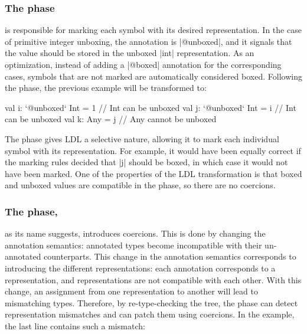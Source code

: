 \vspace{-0.2em}
\subsubsection{The \inject{} phase} is responsible for marking each symbol with its desired representation. In the case of primitive integer unboxing, the annotation is |@unboxed|, and it signals that the value should be stored in the unboxed |int| representation. As an optimization, instead of adding a |@boxed| annotation for the corresponding cases, symbols that are not marked are automatically considered boxed. Following the \inject{} phase, the previous example will be transformed to:

\vspace{-0.1em}
\begin{lstlisting-nobreak}
val i: `@unboxed` Int = 1 // Int can be unboxed
val j: `@unboxed` Int = i // Int can be unboxed
val k: Any = j                  // Any cannot be unboxed
\end{lstlisting-nobreak}

\vspace{-0.9em}
The \inject{} phase gives LDL a selective nature, al\-low\-ing it to mark
each individual symbol with its representation. For example, it would
have been equally correct if the marking rules decided that |j| should
be boxed, in which case it would not have been marked. One of
the properties of the LDL transformation is that boxed and unboxed
values are compatible in the \inject{} phase, so there are no coercions.

\vspace{-0.3em}
\subsubsection{The \coerce{} phase,} as its name suggests, introduces coercions. This is done by changing the annotation semantics: annotated types become incompatible with their un-annotated counterparts. This change in the annotation semantics corresponds to introducing the different representations: each annotation corresponds to a representation, and representations are not compatible with each other. With this change, an assignment from one representation to another will lead to mismatching types. Therefore, by re-type-checking the tree, the \coerce{} phase can detect representation mismatches and can patch them using coercions. In the example, the last line contains such a mismatch:

